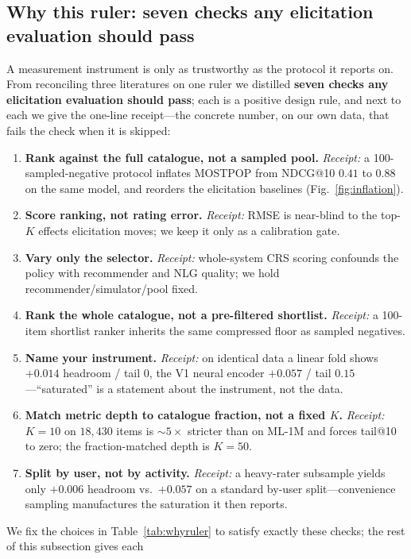 \documentclass[11pt]{article}
\begin{document}
\subsection{Why this ruler: seven checks any elicitation evaluation should pass}\label{sec:whyruler}
A measurement instrument is only as trustworthy as the protocol it reports on. From reconciling three literatures on one
ruler we distilled \textbf{seven checks any elicitation evaluation should pass}; each is a positive design rule, and
next to each we give the one-line receipt---the concrete number, on our own data, that fails the check when it is
skipped:
\begin{enumerate}\itemsep1.5pt
  \item \textbf{Rank against the full catalogue, not a sampled pool.} \emph{Receipt:} a 100-sampled-negative protocol
  inflates MOSTPOP from NDCG@10 $0.41$ to $0.88$ on the same model, and reorders the elicitation baselines
  (Fig.~\ref{fig:inflation}).
  \item \textbf{Score ranking, not rating error.} \emph{Receipt:} RMSE is near-blind to the top-$K$ effects elicitation
  moves; we keep it only as a calibration gate.
  \item \textbf{Vary only the selector.} \emph{Receipt:} whole-system CRS scoring confounds the policy with recommender
  and NLG quality; we hold recommender/simulator/pool fixed.
  \item \textbf{Rank the whole catalogue, not a pre-filtered shortlist.} \emph{Receipt:} a 100-item shortlist ranker
  inherits the same compressed floor as sampled negatives.
  \item \textbf{Name your instrument.} \emph{Receipt:} on identical data a linear fold shows $+0.014$ headroom / tail
  $0$, the V1 neural encoder $+0.057$ / tail $0.15$---``saturated'' is a statement about the instrument, not the data.
  \item \textbf{Match metric depth to catalogue fraction, not a fixed $K$.} \emph{Receipt:} $K{=}10$ on $18{,}430$ items
  is ${\sim}5\times$ stricter than on ML-1M and forces tail@10 to zero; the fraction-matched depth is $K{=}50$.
  \item \textbf{Split by user, not by activity.} \emph{Receipt:} a heavy-rater subsample yields only $+0.006$ headroom
  vs.\ $+0.057$ on a standard by-user split---convenience sampling manufactures the saturation it then reports.
\end{enumerate}
We fix the choices in Table~\ref{tab:whyruler} to satisfy exactly these checks; the rest of this subsection gives each
\end{document}
